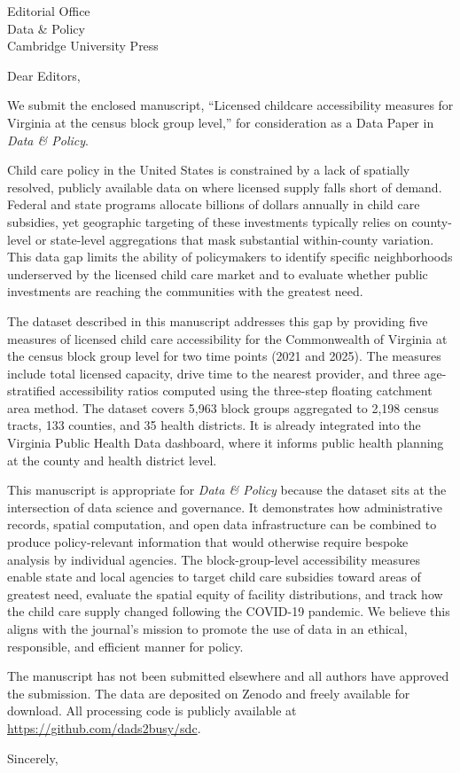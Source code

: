 \documentclass[11pt]{letter}
\date{\today}
\begin{document}
\begin{letter}{Editorial Office\\Data \& Policy\\Cambridge University Press}

\opening{Dear Editors,}

We submit the enclosed manuscript, ``Licensed childcare accessibility measures for Virginia at the census block group level,'' for consideration as a Data Paper in \textit{Data \& Policy}.

Child care policy in the United States is constrained by a lack of spatially resolved, publicly available data on where licensed supply falls short of demand. Federal and state programs allocate billions of dollars annually in child care subsidies, yet geographic targeting of these investments typically relies on county-level or state-level aggregations that mask substantial within-county variation. This data gap limits the ability of policymakers to identify specific neighborhoods underserved by the licensed child care market and to evaluate whether public investments are reaching the communities with the greatest need.

The dataset described in this manuscript addresses this gap by providing five measures of licensed child care accessibility for the Commonwealth of Virginia at the census block group level for two time points (2021 and 2025). The measures include total licensed capacity, drive time to the nearest provider, and three age-stratified accessibility ratios computed using the three-step floating catchment area method. The dataset covers 5,963 block groups aggregated to 2,198 census tracts, 133 counties, and 35 health districts. It is already integrated into the Virginia Public Health Data dashboard, where it informs public health planning at the county and health district level.

This manuscript is appropriate for \textit{Data \& Policy} because the dataset sits at the intersection of data science and governance. It demonstrates how administrative records, spatial computation, and open data infrastructure can be combined to produce policy-relevant information that would otherwise require bespoke analysis by individual agencies. The block-group-level accessibility measures enable state and local agencies to target child care subsidies toward areas of greatest need, evaluate the spatial equity of facility distributions, and track how the child care supply changed following the COVID-19 pandemic. We believe this aligns with the journal's mission to promote the use of data in an ethical, responsible, and efficient manner for policy.

The manuscript has not been submitted elsewhere and all authors have approved the submission. The data are deposited on Zenodo and freely available for download. All processing code is publicly available at \url{https://github.com/dads2busy/sdc}.

\closing{Sincerely,}

\end{letter}
\end{document}

